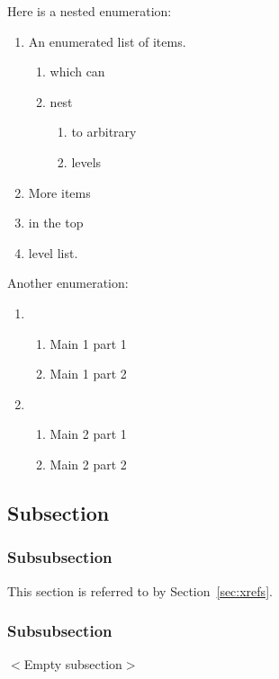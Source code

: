 Here is a nested enumeration:
\begin{enumerate}
	\item An enumerated list of items.
	\begin{enumerate}
		\item which can
		\item nest
		\begin{enumerate}
			\item to arbitrary
			\item levels
		\end{enumerate}
	\end{enumerate}
	\item More items
	\item in the top
	\item level list.
\end{enumerate}
Another enumeration:
\begin{enumerate}
	\item
	\begin{enumerate}
		\item Main 1 part 1
		\item Main 1 part 2
	\end{enumerate}
	\item
	\begin{enumerate}
		\item Main 2 part 1
		\item Main 2 part 2
	\end{enumerate}
\end{enumerate}

\subsection{Subsection}

\subsubsection{Subsubsection}
\label{sec:nested}
This section is referred to by Section~\ref{sec:xrefs}.

\subsubsection{Subsubsection}
\textsf{$<$Empty subsection$>$}
